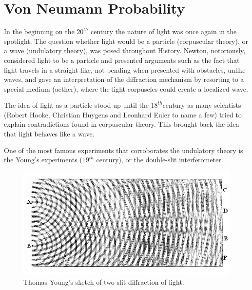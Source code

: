 \clearpage
\section{Von Neumann Probability}

\label{sec:von_neumann_probability}


 
In the beginning on the $20^{th}$ century the nature of light was once again in the spotlight. The question whether light would be a particle (corpuscular theory), or a wave (undulatory theory), was posed throughout History. Newton, notoriously, considered light to be a particle and presented arguments such as the fact that light travels in a straight like, not bending when presented with obstacles, unlike waves, and gave an interpretation of the diffraction mechanism by resorting to a special medium (aether), where the light corpuscles could create a localized wave\cite{DiasdeDeus:1387968}. 


The idea of light as a particle stood up until the $18^{th}$century as many scientists (Robert Hooke, Christian Huygens and Leonhard Euler to name a few) tried to explain contradictions found in corpuscular theory. This brought back the idea that light behaves like a wave. 

One of the most famous experiments that corroborates the undulatory theory is the Young's experiments ($19^{th}$ century), or the double-slit interferometer.

\begin{figure}[h]
\centering 

\includegraphics[scale=0.25]{Figures/Young_Diffraction.png}

\caption[Caption for LOF]
{Thomas Young's sketch of two-slit diffraction of light.} %

\label{fig:double_slit}
\end{figure}

